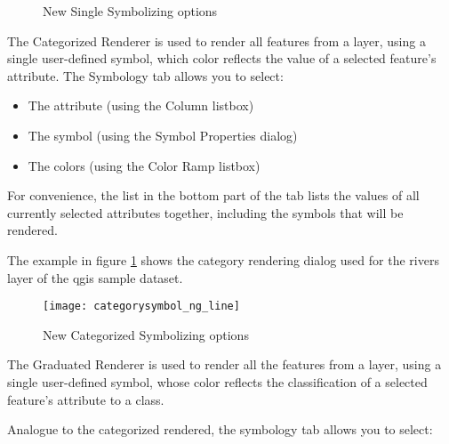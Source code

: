 \begin{figure}[h]
\centering
\caption{New Single Symbolizing options \nixcaption}
   \goodgap
   \goodgap
\end{figure}


The Categorized Renderer is used to render all features from a layer, using a 
single user-defined symbol, which color reflects the value of a selected 
feature's attribute. The Symbology tab allows you to select:

\begin{itemize}
\item The attribute (using the Column listbox)
\item The symbol (using the Symbol Properties dialog)
\item The colors (using the Color Ramp listbox)  
\end{itemize}

For convenience, the list in the bottom part of the tab lists the values of 
all currently selected attributes together, including the symbols that will 
be rendered.

The example in figure \ref{fig:catsymNG} shows the category rendering dialog 
used for the rivers layer of the qgis sample dataset.

\begin{figure}[ht]
   \begin{center}
   \caption{New Categorized Symbolizing options \nixcaption}\label{fig:catsymNG}\smallskip
   \texttt{[image: categorysymbol\_ng\_line]}
\end{center}
\end{figure}


The Graduated Renderer is used to render all the features from a layer, using 
a single user-defined symbol, whose color reflects the classification of a selected 
feature's attribute to a class.

Analogue to the categorized rendered, the symbology tab allows you to select:


